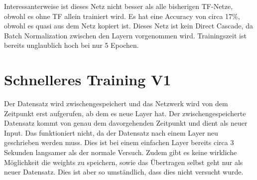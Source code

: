     Interessanterweise ist dieses Netz nicht besser als alle bisherigen TF-Netze, obwohl es ohne TF allein 
    trainiert wird. Es hat eine Accuracy von circa 17\%, obwohl es quasi aus dem Netz kopiert ist. Dieses Netz ist 
    kein Direct Cascade, da Batch Normalization zwischen 
    den Layern vorgenommen wird. Trainingszeit ist bereits unglaublich hoch bei nur 5 Epochen.

\section{Schnelleres Training V1}
    Der Datensatz wird zwischengespeichert und das Netzwerk wird von dem Zeitpunkt 
    erst aufgerufen, ab dem es neue Layer hat. Der zwischengespeicherte Datensatz kommt 
    von genau dem davorgehenden Zeitpunkt und dient als neuer Input. Das funktioniert nicht, 
    da der Datensatz nach einem Layer neu geschrieben werden muss. Dies ist bei einem 
    einfachen Layer bereits circa 3 Sekunden langsamer als der normale Versuch. Zudem gibt 
    es keine wirkliche Möglichkeit die weights zu speichern, sowie das Übertragen selbst 
    geht nur als neuer Datensatz. Dies ist aber so umständlich, dass dies nicht versucht 
    wurde. 

